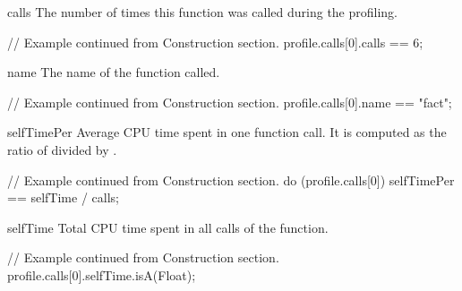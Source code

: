 \begin{urbiscriptapi}
\item[calls]%
  The number of times this function was called during the profiling.
\begin{urbiassert}
// Example continued from Construction section.
profile.calls[0].calls == 6;
\end{urbiassert}

\item[name]%
  The name of the function called.
\begin{urbiassert}
// Example continued from Construction section.
profile.calls[0].name == "fact";
\end{urbiassert}

\item[selfTimePer]%
  Average CPU time spent in one function call. It is computed as the ratio
  of  divided by .
\begin{urbiassert}
// Example continued from Construction section.
do (profile.calls[0])
{
  selfTimePer == selfTime / calls;
}
\end{urbiassert}

\item[selfTime]%
  Total CPU time spent in all calls of the function.
\begin{urbiassert}
// Example continued from Construction section.
profile.calls[0].selfTime.isA(Float);
\end{urbiassert}

\end{urbiscriptapi}


